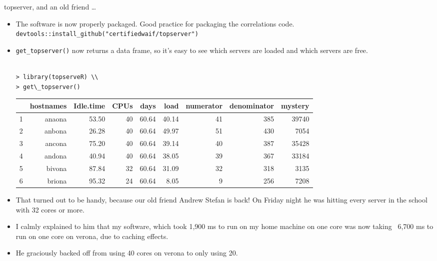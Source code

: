 \documentclass{beamer}
\begin{document}
\begin{frame}{topserver, and an old friend \ldots}
\begin{itemize}
\item The software is now properly packaged. Good practice for packaging the correlations code.
\small \texttt{devtools::install\_github("certifiedwaif/topserver")}
\item \texttt{get\_topserver()} now returns a data frame, so it's easy to see which servers are loaded and 
			which servers are free. 

{\tiny
\begin{verbatim}

> library(topserveR) \\
> get\_topserver()
\end{verbatim}
\begin{tabular}{|l|rrrrrrrr|}
\hline
   &hostnames &Idle.time &CPUs  &days  &load &numerator &denominator &mystery \\
\hline
1&     anaona&     53.50&   40& 60.64& 40.14&        41&         385&   39740 \\
2&     anbona&     26.28&   40& 60.64& 49.97&        51&         430&    7054 \\
3&     ancona&     75.20&   40& 60.64& 39.14&        40&         387&   35428 \\
4&     andona&     40.94&   40& 60.64& 38.05&        39&         367&   33184 \\
5&     bivona&     87.84&   32& 60.64& 31.09&        32&         318&    3135 \\
6&     briona&     95.32&   24& 60.64&  8.05&         9&         256&    7208 \\
\hline
\end{tabular}
}

\item That turned out to be handy, because our old friend Andrew Stefan is back! On Friday night he was 
			hitting every server in the school with	32 cores or more.
\item I calmly explained to him that my software, which took 1,900 ms to run on my home machine on one core 
			was now taking ~6,700 ms to run on one core on verona, due to caching effects.
\item He graciously backed off from using 40 cores on verona to only using 20.
\end{itemize}
\end{frame}
\end{document}
